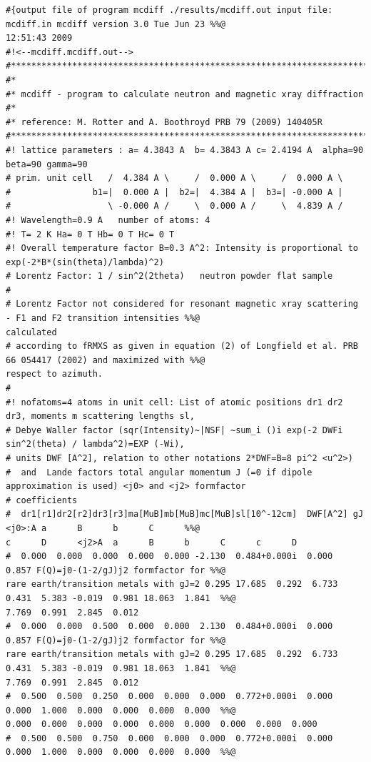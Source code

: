 {\footnotesize
\begin{verbatim}
#{output file of program mcdiff ./results/mcdiff.out input file: mcdiff.in mcdiff version 3.0 Tue Jun 23 %%@
12:51:43 2009
#!<--mcdiff.mcdiff.out-->
#***********************************************************************
#*
#* mcdiff - program to calculate neutron and magnetic xray diffraction
#*
#* reference: M. Rotter and A. Boothroyd PRB 79 (2009) 140405R
#***********************************************************************
#! lattice parameters : a= 4.3843 A  b= 4.3843 A c= 2.4194 A  alpha=90  beta=90 gamma=90
# prim. unit cell   /  4.384 A \     /  0.000 A \     /  0.000 A \ 
#                b1=|  0.000 A |  b2=|  4.384 A |  b3=| -0.000 A |
#                   \ -0.000 A /     \  0.000 A /     \  4.839 A /
#! Wavelength=0.9 A   number of atoms: 4
#! T= 2 K Ha= 0 T Hb= 0 T Hc= 0 T
#! Overall temperature factor B=0.3 A^2: Intensity is proportional to exp(-2*B*(sin(theta)/lambda)^2)
# Lorentz Factor: 1 / sin^2(2theta)   neutron powder flat sample
#
# Lorentz Factor not considered for resonant magnetic xray scattering - F1 and F2 transition intensities %%@
calculated
# according to fRMXS as given in equation (2) of Longfield et al. PRB 66 054417 (2002) and maximized with %%@
respect to azimuth.
#
#! nofatoms=4 atoms in unit cell: List of atomic positions dr1 dr2 dr3, moments m scattering lengths sl,
# Debye Waller factor (sqr(Intensity)~|NSF| ~sum_i ()i exp(-2 DWFi sin^2(theta) / lambda^2)=EXP (-Wi),
# units DWF [A^2], relation to other notations 2*DWF=B=8 pi^2 <u^2>)
#  and  Lande factors total angular momentum J (=0 if dipole approximation is used) <j0> and <j2> formfactor
# coefficients
#  dr1[r1]dr2[r2]dr3[r3]ma[MuB]mb[MuB]mc[MuB]sl[10^-12cm]  DWF[A^2] gJ     <j0>:A a      B      b      C      %%@
c      D      <j2>A  a      B      b      C      c      D
#  0.000  0.000  0.000  0.000  0.000 -2.130  0.484+0.000i  0.000  0.857 F(Q)=j0-(1-2/gJ)j2 formfactor for %%@
rare earth/transition metals with gJ=2 0.295 17.685  0.292  6.733  0.431  5.383 -0.019  0.981 18.063  1.841  %%@
7.769  0.991  2.845  0.012 
#  0.000  0.000  0.500  0.000  0.000  2.130  0.484+0.000i  0.000  0.857 F(Q)=j0-(1-2/gJ)j2 formfactor for %%@
rare earth/transition metals with gJ=2 0.295 17.685  0.292  6.733  0.431  5.383 -0.019  0.981 18.063  1.841  %%@
7.769  0.991  2.845  0.012 
#  0.500  0.500  0.250  0.000  0.000  0.000  0.772+0.000i  0.000  0.000  1.000  0.000  0.000  0.000  0.000  %%@
0.000  0.000  0.000  0.000  0.000  0.000  0.000  0.000  0.000 
#  0.500  0.500  0.750  0.000  0.000  0.000  0.772+0.000i  0.000  0.000  1.000  0.000  0.000  0.000  0.000  %%@

\end{verbatim}}
